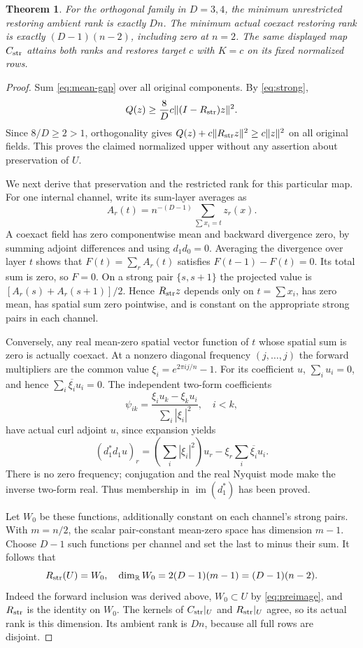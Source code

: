 \documentclass[11pt,a4paper]{article}
\newtheorem{theorem}{Theorem}[section]
\newcommand{\R}{\mathbb R}
\newcommand{\im}{\operatorname{im}}
\newcommand{\norm}[1]{\lVert#1\rVert}
\begin{document}
\begin{theorem}\label{thm:exact}
For the orthogonal family in $D=3,4$, the minimum unrestricted restoring
ambient rank is exactly $Dn$. The minimum actual coexact restoring rank is
exactly $(D-1)(n-2)$, including zero at $n=2$. The same displayed map
$C_{\rm str}$ attains both ranks and restores target $c$ with $K=c$ on its
fixed normalized rows.
\end{theorem}
\begin{proof}
Sum \eqref{eq:mean-gap} over all original components. By \eqref{eq:strong},
\[
 Q(z)\geq\frac8D c\norm{(I-R_{\rm str})z}^2.
\]
Since $8/D\geq2>1$, orthogonality gives
$Q(z)+c\norm{R_{\rm str}z}^2\geq c\norm{z}^2$ on all original fields.
This proves the claimed normalized upper without any assertion about
preservation of $U$.

We next derive that preservation and the restricted rank for this particular
map. For one internal channel, write its sum-layer averages as
\[
 A_r(t)=n^{-(D-1)}\sum_{\sum x_i=t}z_r(x).
\]
A coexact field has zero componentwise mean and backward divergence zero,
by summing adjoint differences and using $d_1d_0=0$. Averaging the divergence
over layer $t$ shows that $F(t)=\sum_r A_r(t)$ satisfies $F(t-1)-F(t)=0$.
Its total sum is zero, so $F=0$. On a strong pair $\{s,s+1\}$ the projected
value is $[A_r(s)+A_r(s+1)]/2$. Hence $R_{\rm str}z$ depends only on
$t=\sum x_i$, has zero mean, has spatial sum zero pointwise, and is constant
on the appropriate strong pairs in each channel.

Conversely, any real mean-zero spatial vector function of $t$ whose spatial
sum is zero is actually coexact. At a nonzero diagonal frequency
$(j,\ldots,j)$ the forward multipliers are the common value
$\xi_i=e^{2\pi i j/n}-1$. For its coefficient $u$, $\sum_i u_i=0$, and hence
$\sum_i\overline{\xi_i}u_i=0$. The independent two-form coefficients
\begin{equation}\label{eq:preimage}
 \psi_{ik}=\frac{\xi_i u_k-\xi_k u_i}{\sum_i|\xi_i|^2},\quad i<k,
\end{equation}
have actual curl adjoint $u$, since expansion yields
\[
 (d_1^*d_1u)_r=(\textstyle\sum_i|\xi_i|^2)u_r
       -\xi_r\textstyle\sum_i\overline{\xi_i}u_i.
\]
There is no zero frequency; conjugation and the real Nyquist mode make the
inverse two-form real. Thus membership in $\im(d_1^*)$ has been proved.

Let $W_0$ be these functions, additionally constant on each channel's strong
pairs. With $m=n/2$, the scalar pair-constant mean-zero space has dimension
$m-1$. Choose $D-1$ such functions per channel and set the last to minus their
sum. It follows that
\[
 R_{\rm str}(U)=W_0,\quad \dim_\R W_0=2(D-1)(m-1)=(D-1)(n-2).
\]
Indeed the forward inclusion was derived above, $W_0\subset U$ by
\eqref{eq:preimage}, and $R_{\rm str}$ is the identity on $W_0$. The kernels
of $C_{\rm str}|_U$ and $R_{\rm str}|_U$ agree, so its actual rank is this
dimension. Its ambient rank is $Dn$, because all full rows are disjoint.


\end{proof}
\end{document}

